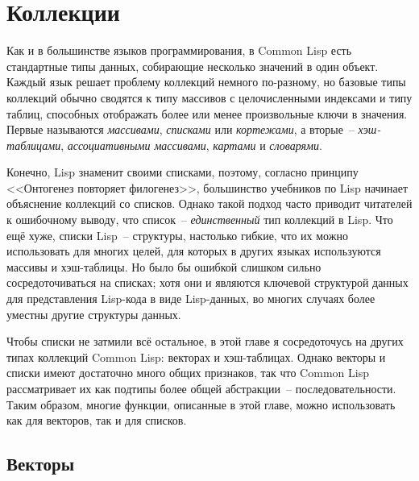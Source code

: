 \chapter{Коллекции}
\label{ch:11}

\thispagestyle{empty}

Как и в большинстве языков программирования, в Common Lisp есть стандартные типы данных,
собирающие несколько значений в один объект.  Каждый язык решает проблему коллекций
немного по-разному, но базовые типы коллекций обычно сводятся к типу массивов с целочисленными
индексами и типу таблиц, способных отображать более или менее
произвольные ключи в значения.  Первые называются \textit{массивами}, \textit{списками} или \textit{кортежами}, а
вторые~-- \textit{хэш-таблицами}, \textit{ассоциативными массивами}, \textit{картами} и \textit{словарями}.

Конечно, Lisp знаменит своими списками, поэтому, согласно принципу <<Онтогенез повторяет
филогенез>>, большинство учебников по Lisp начинает объяснение коллекций со
списков. Однако такой подход часто приводит читателей к ошибочному выводу, что
список~-- \textit{единственный} тип коллекций в Lisp.  Что ещё хуже,
списки Lisp~-- структуры, настолько гибкие, что их можно использовать для многих целей, для
которых в других языках используются массивы и хэш-таблицы.  Но было бы ошибкой слишком
сильно сосредоточиваться на списках; хотя они и являются ключевой структурой данных для
представления Lisp-кода в виде Lisp-данных, во многих случаях более уместны другие структуры данных.

Чтобы списки не затмили всё остальное, в этой главе я сосредоточусь на других типах
коллекций Common Lisp: векторах и хэш-таблицах.
Однако векторы и списки имеют достаточно много общих признаков, так что Common Lisp
рассматривает их как подтипы более общей абстракции~-- последовательности.  Таким образом,
многие функции, описанные в этой главе, можно использовать как для векторов, так и для
списков.

\section{Векторы}

